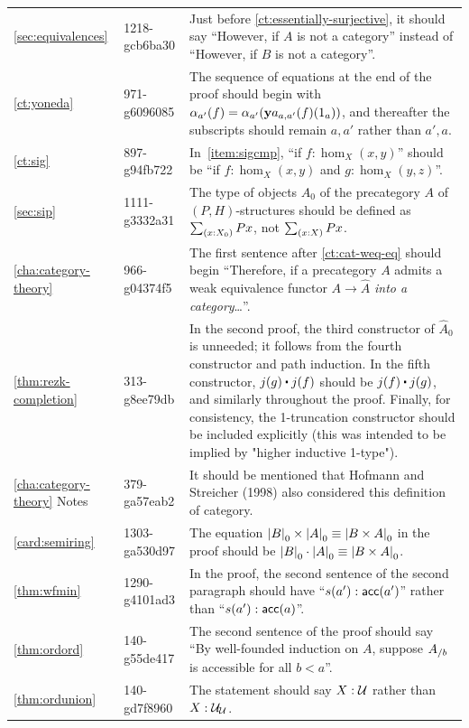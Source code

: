 \documentclass[
%
%
11pt %
]{article}
\begin{document}
\begin{longtable}{llp{10.5cm}}
  \cref{sec:equivalences}
  & 1218-gcb6ba30
  & Just before \cref{ct:essentially-surjective}, it should say ``However, if $A$ is not a category'' instead of ``However, if $B$ is not a category''.\\
  \cref{ct:yoneda}
  & 971-g6096085
  & The sequence of equations at the end of the proof should begin with $\alpha_{a'}(f) = \alpha_{a'} (\mathbf{y} a_{a,a'}(f)(1_a))$, and thereafter the subscripts should remain $a,a'$ rather than $a',a$.\\
  \cref{ct:sig}
  & 897-g94fb722
  & In~\ref{item:sigcmp}, ``if $f:\hom_X(x,y)$'' should be ``if $f:\hom_X(x,y)$ and $g:\hom_X(y,z)$''.\\
  \cref{sec:sip}
  & 1111-g3332a31
  & The type of objects $A_0$ of the precategory $A$ of $(P,H)$-structures should be defined as $\sm{x:X_0} Px$, not $\sm{x:X} Px$.\\
  \cref{cha:category-theory}
  & 966-g04374f5
  & The first sentence after \cref{ct:cat-weq-eq} should begin ``Therefore, if a precategory $A$ admits a weak equivalence functor $A\to \widehat{A}$ \emph{into a category}\dots''.\\
  \cref{thm:rezk-completion}
  & 313-g8ee79db
  & In the second proof, the third constructor of $\widehat A_0$ is unneeded; it follows from the fourth constructor and path induction.
  In the fifth constructor, $j(g)\ct j(f)$ should be $j(f)\ct j(g)$, and similarly throughout the proof.
  Finally, for consistency, the 1-truncation constructor should be included explicitly (this was intended to be implied by "higher inductive 1-type").\\
  \cref{cha:category-theory} Notes
  & 379-ga57eab2
  & It should be mentioned that Hofmann and Streicher (1998) also considered this definition of category.\\
  \cref{card:semiring}
  & 1303-ga530d97
  & The equation $\mathopen{}\left|B\right|_{0}^{}\mathclose{}\times\mathopen{}\left|A\right|_{0}^{}\mathclose{} \equiv \mathopen{}\left|B\times A\right|_{0}^{}\mathclose{}$ in the proof should be $\mathopen{}\left|B\right|_{0}^{}\mathclose{}\cdot\mathopen{}\left|A\right|_{0}^{}\mathclose{} \equiv \mathopen{}\left|B\times A\right|_{0}^{}\mathclose{}$.\\
  \cref{thm:wfmin}
  & 1290-g4101ad3
  & In the proof, the second sentence of the second paragraph should have ``$s(a'):\mathsf{acc}(a')$'' rather than ``$s(a'):\mathsf{acc}(a)$''.\\
  \cref{thm:ordord}
  & 140-g55de417
  & The second sentence of the proof should say ``By well-founded induction on $A$, suppose ${A}_{/b}$ is accessible for all $b<a$''.\\
  \cref{thm:ordunion}
  & 140-gd7f8960
  & The statement should say $X:\mathcal{U}$ rather than $X:\mathcal{U}_\mathcal{U}$.\\

\end{longtable}
\end{document}
